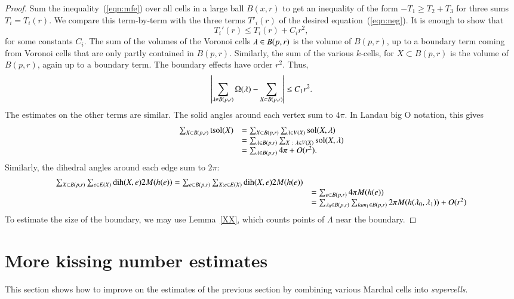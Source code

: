 \begin{proof}
Sum the inequality~(\ref{eqn:mfe}) over all cells in a large ball $B(x,r)$ to get an
inequality of the form $-T_1 \ge  T_2 + T_3$ for three sums $T_i = T_i(r)$.  We compare this term-by-term
with the three terms $T'_i(r)$ of the desired equation~(\ref{eqn:neg}). 
It is enough to show that
$$
T_i'(r) \le T_i(r) + C_i r^2,
$$
for some constants $C_i$.
The sum of the volumes of the Voronoi cells $\lambda\in B(p,r)$ is
the volume of $B(p,r)$, up to a boundary term coming from Voronoi cells
that are only partly contained in $B(p,r)$.  Similarly, the sum of
the various $k$-cells, for $X\subset B(p,r)$ is the volume of $B(p,r)$,
again up to a boundary term. The boundary effects have order $r^2$.
Thus,
$$
\left| \sum_{\lambda\in B(p,r)} \Omega(\lambda) - \sum_{X\subset B(p,r)} \right| \le C_1 r^2.
$$
The estimates on the other terms are similar.  The solid angles
around each vertex sum to $4\pi$.
In Landau big O notation, this gives
$$
\begin{array}{lll}
\sum_{X\subset B(p,r)} {\operatorname{tsol}}(X) &= 
\sum_{X\subset B(p,r)} \sum_{\lambda\in V(X)} \operatorname{sol}(X,\lambda)\\
 &=\sum_{\lambda\in B(p,r)} \sum_{X\ :\  \lambda\in V(X)} \operatorname{sol}(X,\lambda)\\
 &=\sum_{\lambda\in B(p,r)} 4\pi    + O(r^2).
\end{array}
$$
Similarly, the dihedral angles around each edge sum to $2\pi$:
$$
\begin{array}{lll}
\sum_{X\subset B(p,r)} \sum_{e\in E(X)} \operatorname{dih}(X,e) 2 M(h(e)) =
\sum_{e\subset B(p,r)} \sum_{X: e\in E(X)} \operatorname{dih}(X,e) 2 M(h(e)) \\
 &=\sum_{e\subset B(p,r)} 4\pi M(h(e)) \\
 &=\sum_{\lambda_0\in B(p,r)} \sum_{lam_1\in B(p,r) } 2\pi M(h(\lambda_0,\lambda_1)) + O(r^2)
\end{array}
$$
To estimate the size of the boundary, we may use Lemma~\ref{XX}, which counts points of $\Lambda$ near the boundary.
\end{proof}




\section{More kissing number estimates}

This section shows how to improve on the estimates of the previous section
by combining various Marchal cells into {\it supercells}.

